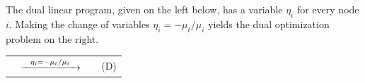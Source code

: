 \documentclass[11pt]{article}
\theoremstyle{definition}
\theoremstyle{definition}
\theoremstyle{definition}
\newcommand{\R}{\mathbb{R}}
\newcommand{\gij}{\gamma_{ij}}
\begin{document}
	The dual linear program, given on the left below, has a variable $\eta_i$ for
	every node $i$. 
	Making the change of variables $\eta_i = - \mu_t / \mu_i$ yields the
	dual optimization problem on the right.
    \vspace{0.5cm}

	\begin{tabular}{rcll}
		\hspace*{-1.05cm}
	\resizebox{0.37\textwidth}{!}{
		\fbox{
	\begin{minipage}{0.35\textwidth}
	\begin{alignat*}{4}
    \min &\quad &\sum_{i \in V \setminus t} b_i \eta_i \\
    \text{s.t.}
    &   &\gij \eta_j - \eta_i &\geq 0 \quad &&\forall\; &&(i, j) \in E \\
    &   &                     &             &&          &&\ i, j \neq t \\
    &   &\gamma_{ti} \eta_i &\geq -1 \quad  &&\forall\; &&(i, t) \in E \\
    &   &-\eta_i &\geq \gamma_{it} \quad    &&\forall\; &&(t, i) \in E \\
    &   &\eta_i &\leq 0 \quad               &&\forall\; &&i \in V \setminus t
    \end{alignat*}
	\end{minipage}
}
} & 
	$\xrightarrow{\hspace*{0.25cm}\eta_i = - \mu_t / \mu_i\hspace*{0.25cm}}$
	&
	\resizebox{0.37\textwidth}{!}{
		\fbox{
	\begin{minipage}{0.4\textwidth}
    \begin{alignat*}{3}
    \max &\quad &\mu_t \sum_{j \in V \setminus t} \frac{b_j}{\mu_j}  \\
    \text{s.t.}
    &   &\gij \mu_i &\leq \mu_j \quad &&\forall\; (i, j) \in E \\
    &   &\mu_i &\in \R_{>0} \cup \infty \quad &&\forall\; i \in V \setminus t \\
    &   &\mu_t &\in \R_{>0}
    \end{alignat*}
	\end{minipage}
}
} & \hspace*{0.4cm}(D)
\end{tabular}
\vspace{0.5cm}
\end{document}

